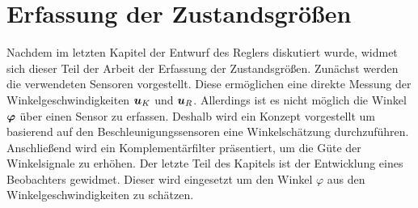 \ifx\FORMAT\undefined


\fi

\chapter{Erfassung der Zustandsgrößen}
Nachdem im letzten Kapitel der Entwurf des Reglers diskutiert wurde, widmet sich dieser Teil der Arbeit der Erfassung der Zustandsgrößen. Zunächst werden die verwendeten Sensoren vorgestellt. Diese ermöglichen eine direkte Messung der Winkelgeschwindigkeiten $\boldsymbol{u}_K$ und $\boldsymbol{u}_R$. Allerdings ist es nicht möglich die Winkel $\boldsymbol{\varphi}$ über einen Sensor zu erfassen. Deshalb wird ein Konzept vorgestellt um basierend auf den Beschleunigungssensoren eine Winkelschätzung durchzuführen. Anschließend wird ein Komplementärfilter präsentiert, um die Güte der Winkelsignale zu erhöhen. Der letzte Teil des Kapitels ist der Entwicklung eines Beobachters gewidmet. Dieser wird eingesetzt um den Winkel $\varphi$ aus den Winkelgeschwindigkeiten zu schätzen.
\newpage

\newpage

\newpage

\newpage



\ifx\FORMAT\undefined

\fi
